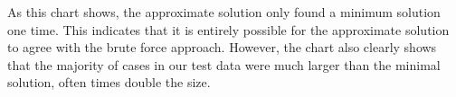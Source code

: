 \documentclass[paper.tex]{subfiles}
\begin{document}
As this chart shows, the approximate solution only found a minimum solution one time.
This indicates that it is entirely possible for the approximate solution to agree with the brute force approach.
However, the chart also clearly shows that the majority of cases in our test data were much larger than the minimal solution, often times double the size.
\end{document}
